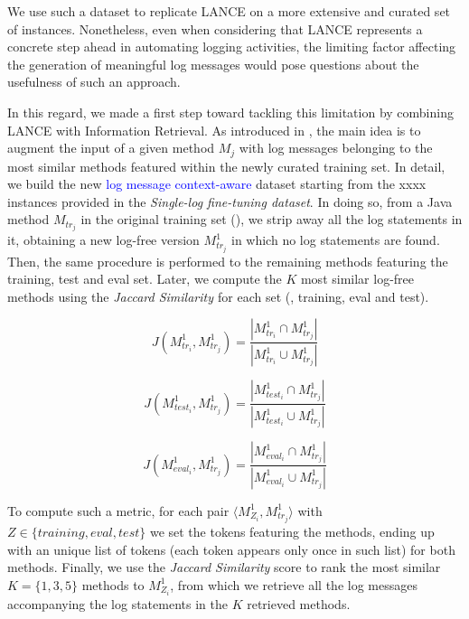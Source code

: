 We use such a dataset to replicate LANCE on a more extensive and curated set of instances.
Nonetheless, even when considering that LANCE represents a concrete step ahead in automating logging activities, the limiting factor affecting the generation of meaningful log messages would pose questions about the usefulness of such an approach.  

In this regard, we made a first step toward tackling this limitation by combining LANCE with Information Retrieval.
As introduced in , the main idea is to augment the input of a given \java method $M_{j}$ with log messages belonging to the most similar methods featured within the newly curated training set. In detail, we build the new  \textcolor{blue}{log message context-aware} dataset starting from the xxxx instances provided in the \textit{Single-log fine-tuning dataset}. In doing so, from a Java method $M_{tr_j}$ in the original training set (), we strip away all the log statements in it, obtaining a new log-free version $M_{tr_j}^{1}$ in which no log statements are found. Then, the  same procedure is performed to the remaining methods featuring the training, test and eval set. Later, we compute the $K$ most similar log-free methods using the \textit{Jaccard Similarity \cite{hancock2004jaccard}} for each set (\ie, training, eval and test).

\begin{equation}
	J(M_{tr_i}^{1}, M_{tr_j}^{1})=\frac{|M_{tr_i}^{1}  \cap M_{tr_j}^{1} |}{|M_{tr_i}^{1}  \cup M_{tr_j}^{1} |}
\end{equation}

\begin{equation}
	J(M_{test_i}^{1}, M_{tr_j}^{1})=\frac{|M_{test_i}^{1}  \cap M_{tr_j}^{1} |}{| M_{test_i}^{1}  \cup M_{tr_j}^{1} |}
\end{equation}


\begin{equation}
	J(M_{eval_i}^{1}, M_{tr_j}^{1})=\frac{|M_{eval_i}^{1} \cap M_{tr_j}^{1} |}{| M_{eval_i}^{1} \cup M_{tr_j}^{1} |}
\end{equation}

To compute such a metric, for each pair $\langle M_{Z_i}^{1}, M_{tr_j}^{1} \rangle$ with $Z \in \{ training, eval, test\}$ we set the \java tokens featuring the methods, ending up with an unique list of \java tokens (\ie each token appears only once in such list) for both methods.
Finally, we use the \textit{Jaccard Similarity} score to rank the most similar $K=\{1,3,5\}$ methods to $M_{Z_i}^{1}$, from which we retrieve all the log messages accompanying the log statements in the $K$ retrieved methods.

